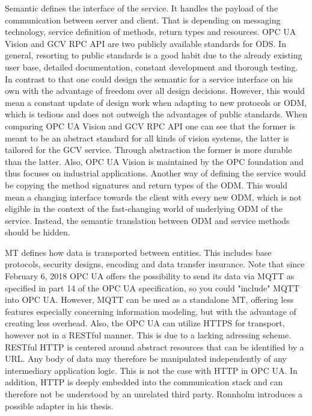 Semantic defines the interface of the service. It handles the payload of the communication between server and client. That is depending on messaging technology, service definition of methods, return types and resources. OPC UA Vision \cite{VDMA2018OPCSpecification} and GCV RPC API \cite{Lastvisited2018-11-272018CloudGRPC} are two publicly available standards for ODS. In general, resorting to public standards is a good habit due to the already existing user base, detailed documentation, constant development and thorough testing. In contrast to that one could design the semantic for a service interface on his own with the advantage of freedom over all design decisions. However, this would mean a constant update of design work when adapting to new protocols or ODM, which is tedious and does not outweigh the advantages of public standards. When comparing OPC UA Vision and GCV RPC API one can see that the former is meant to be an abstract standard for all kinds of vision systems, the latter is tailored for the GCV service. Through abstraction the former is more durable than the latter. Also, OPC UA Vision is maintained by the OPC foundation and thus focuses on industrial applications. Another way of defining the service would be copying the method signatures and return types of the ODM. This would mean a changing interface towards the client with every new ODM, which is not eligible in the context of the fast-changing world of underlying ODM of the service. Instead, the semantic translation between ODM and service methods should be hidden. 

MT defines how data is transported between entities. This includes base protocols, security designs, encoding and data transfer insurance. Note that since February 6, 2018 OPC UA offers the possibility to send its data via MQTT as specified in part 14 of the OPC UA specification, so you could "include" MQTT into OPC UA. However, MQTT can be used as a standalone MT, offering less features especially concerning information modeling, but with the advantage of creating less overhead. Also, the OPC UA can utilize HTTPS for transport, however not in a RESTful manner. \cite{Ronnholm2018IntegrationTranslator} This is due to a lacking adressing scheme. RESTful HTTP is centered around abstract resources that can be identified by a URL. Any body of data may therefore be manipulated independently of any intermediary application logic. This is not the case with HTTP in OPC UA. In addition, HTTP is deeply embedded into the communication stack and can therefore not be understood by an unrelated third party. Ronnholm introduces a possible adapter in his thesis. \cite{Ronnholm2018IntegrationTranslator}

